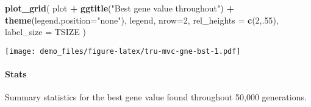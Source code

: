 \documentclass[]{book}
\newenvironment{Shaded}{\begin{snugshade}}{\end{snugshade}}
\newcommand{\DataTypeTok}[1]{\textcolor[rgb]{0.13,0.29,0.53}{#1}}
\newcommand{\DecValTok}[1]{\textcolor[rgb]{0.00,0.00,0.81}{#1}}
\newcommand{\KeywordTok}[1]{\textcolor[rgb]{0.13,0.29,0.53}{\textbf{#1}}}
\newcommand{\NormalTok}[1]{#1}
\newcommand{\OperatorTok}[1]{\textcolor[rgb]{0.81,0.36,0.00}{\textbf{#1}}}
\newcommand{\OtherTok}[1]{\textcolor[rgb]{0.56,0.35,0.01}{#1}}
\newcommand{\StringTok}[1]{\textcolor[rgb]{0.31,0.60,0.02}{#1}}
\let\oldparagraph\paragraph
\renewcommand{\paragraph}[1]{\oldparagraph{#1}\mbox{}}
\begin{document}
\begin{Shaded}
\begin{Highlighting}[]
\KeywordTok{plot_grid}\NormalTok{(}
\NormalTok{  plot }\OperatorTok{+}
\StringTok{    }\KeywordTok{ggtitle}\NormalTok{(}\StringTok{"Best gene value throughout"}\NormalTok{) }\OperatorTok{+}
\StringTok{    }\KeywordTok{theme}\NormalTok{(}\DataTypeTok{legend.position=}\StringTok{"none"}\NormalTok{),}
\NormalTok{  legend,}
  \DataTypeTok{nrow=}\DecValTok{2}\NormalTok{,}
  \DataTypeTok{rel_heights =} \KeywordTok{c}\NormalTok{(}\DecValTok{2}\NormalTok{,.}\DecValTok{55}\NormalTok{),}
  \DataTypeTok{label_size =}\NormalTok{ TSIZE}
\NormalTok{)}
\end{Highlighting}
\end{Shaded}

\texttt{[image: demo\_files/figure-latex/tru-mvc-gne-bst-1.pdf]}

\hypertarget{stats-27}{%
\paragraph{Stats}\label{stats-27}}

Summary statistics for the best gene value found throughout 50,000 generations.

\begin{Shaded}
\end{Shaded}
\end{document}
